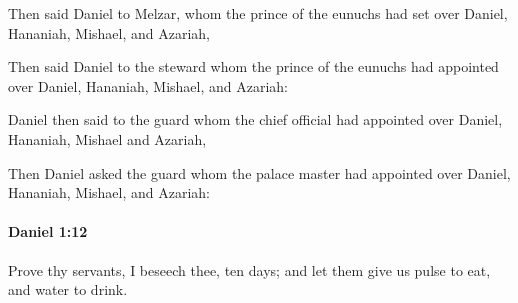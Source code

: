 			Then said Daniel to Melzar, whom the prince of the eunuchs had set over Daniel, Hananiah, Mishael, and Azariah,

			\begin{versebox}
					\item[BHS] 
					\item[LXX] 
					\item[ASV] Then said Daniel to the steward whom the prince of the eunuchs had appointed over Daniel, Hananiah, Mishael, and Azariah:
					\item[NIV] Daniel then said to the guard whom the chief official had appointed over Daniel, Hananiah, Mishael and Azariah,
					\item[NRSV] Then Daniel asked the guard whom the palace master had appointed over Daniel, Hananiah, Mishael, and Azariah:
			\end{versebox}

		\paragraph{Daniel 1:12} %
			\label{DANIEL-1-12}

			Prove thy servants, I beseech thee, ten days; and let them give us pulse to eat, and water to drink.

